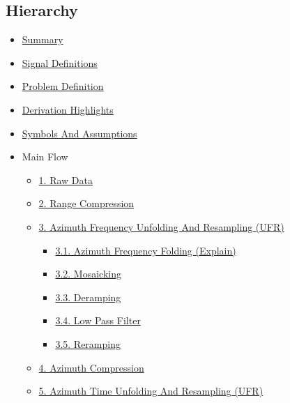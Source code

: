\documentclass[11pt]{article}
\providecommand{\tightlist}{%
  \setlength{\itemsep}{0pt}\setlength{\parskip}{0pt}}
\begin{document}
\hypertarget{hierarchy}{%
\subsection{Hierarchy}\label{hierarchy}}

\begin{itemize}
\tightlist
\item
  \protect\hyperlink{summary}{Summary}
\item
  \protect\hyperlink{signal-definitions}{Signal Definitions}
\item
  \protect\hyperlink{problem-definition}{Problem Definition}
\item
  \protect\hyperlink{derivation-highlights}{Derivation Highlights}
\item
  \protect\hyperlink{symbols-and-assumptions}{Symbols And Assumptions}
\item
  Main Flow

  \begin{itemize}
  \tightlist
  \item
    \protect\hyperlink{1-raw-data}{1. Raw Data}
  \item
    \protect\hyperlink{2-range-compression}{2. Range Compression}
  \item
    \protect\hyperlink{3-azimuth-frequency-unfolding-and-resampling-ufr}{3.
    Azimuth Frequency Unfolding And Resampling (UFR)}

    \begin{itemize}
    \tightlist
    \item
      \protect\hyperlink{31-azimuth-frequency-folding-explain}{3.1.
      Azimuth Frequency Folding (Explain)}
    \item
      \protect\hyperlink{32-mosaicking}{3.2. Mosaicking}
    \item
      \protect\hyperlink{33-deramping}{3.3. Deramping}
    \item
      \protect\hyperlink{34-low-pass-filter}{3.4. Low Pass Filter}
    \item
      \protect\hyperlink{35-reramping}{3.5. Reramping}
    \end{itemize}
  \item
    \protect\hyperlink{4-azimuth-compression}{4. Azimuth Compression}
  \item
    \protect\hyperlink{5-azimuth-time-unfolding-and-resampling-ufr}{5.
    Azimuth Time Unfolding And Resampling (UFR)}


\end{itemize}
\end{itemize}
\end{document}
